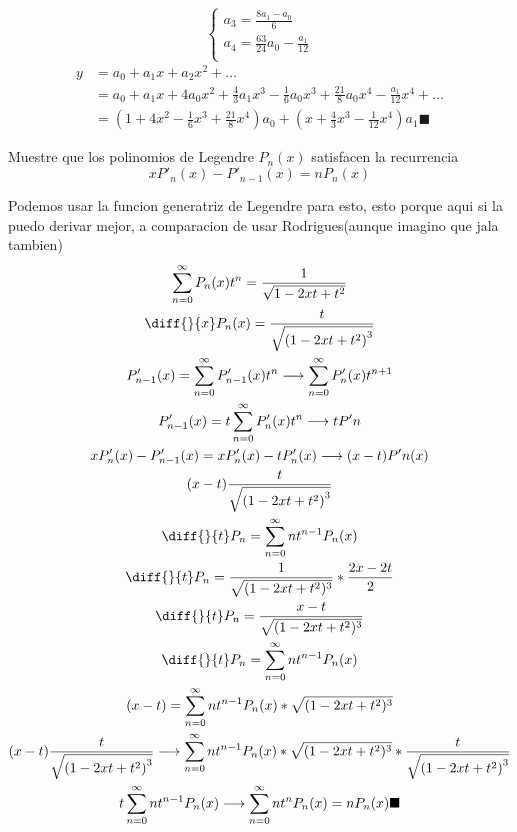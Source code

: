 \begin{mdframed}
\begin{equation}
\begin{cases}
                   a_3=\frac{8a_1-a_0}{6}\\
                   a_4=\frac{63}{24}a_0-\frac{a_1}{12}\\
                \end{cases}
            \end{equation}
    \begin{align*}
        y &= a_0+a_1x+a_2x^2+\dots\\
        &=a_0+a_1x+4a_0x^2+\frac{4}{3}a_1x^3-\frac{1}{6}a_0x^3+\frac{21}{8}a_0x^4-\frac{a_1}{12}x^4+\dots\\
        &= (1+4x^2-\frac{1}{6}x^3+\frac{21}{8}x^4)a_0+(x+\frac{4}{3}x^3-\frac{1}{12}x^4)a_1 \blacksquare
        \end{align*}
\end{mdframed}
\begin{prob}
 Muestre que los polinomios de Legendre $P_n(x)$ satisfacen la recurrencia
$$xP'_n(x)-P'_{n-1}(x) = nP_n(x)$$
\end{prob}
\begin{mdframed}
    Podemos usar la funcion generatriz de Legendre para esto, esto porque aqui si la puedo derivar mejor, a comparacion de usar Rodrigues(aunque imagino que jala tambien)
    \begin{gather*}
        \sum_{n=0}^{\infty}P_n(x)t^n = \frac{1}{\sqrt{1-2xt+t^2}}\\
        \diff{}{x}P_n(x)=\frac{t}{\sqrt{{(1-2xt+t^2)}^3}}\\
        P'_{n-1}(x)=\sum_{n=0}^{\infty}P'_{n-1}(x)t^n \longrightarrow
        \sum_{n=0}^{\infty}P'_n(x)t^{n+1}\\
        P'_{n-1}(x)=t\sum_{n=0}^{\infty}P'_{n}(x)t^n \longrightarrow tP'n\\
        xP'_n(x)-P'_{n-1}(x) =  xP'_n(x)-tP'_{n}(x)\longrightarrow(x-t)P'n(x)\\
        (x-t)\frac{t}{\sqrt{{(1-2xt+t^2)}^3}}\\
        \diff{}{t}P_n=\sum_{n=0}^{\infty}nt^{n-1}P_n(x)\\
        \diff{}{t}P_n= \frac{1}{\sqrt{(1-2xt+t^2)^3}}*\frac{2x-2t}{2}\\
        \diff{}{t}P_n= \frac{x-t}{\sqrt{(1-2xt+t^2)^3}}\\
        \diff{}{t}P_n=\sum_{n=0}^{\infty}nt^{n-1}P_n(x)\\
        (x-t)= \sum_{n=0}^{\infty}nt^{n-1}P_n(x)*\sqrt{(1-2xt+t^2)^3}\\
        (x-t)\frac{t}{\sqrt{{(1-2xt+t^2)}^3}}\longrightarrow \sum_{n=0}^{\infty}nt^{n-1}P_n(x)*\sqrt{(1-2xt+t^2)^3}*\frac{t}{\sqrt{{(1-2xt+t^2)}^3}}\\
        t\sum_{n=0}^{\infty}nt^{n-1}P_n(x) \longrightarrow \sum_{n=0}^{\infty}nt^{n}P_n(x) = nP_n(x) \blacksquare
    \end{gather*}
\end{mdframed}
